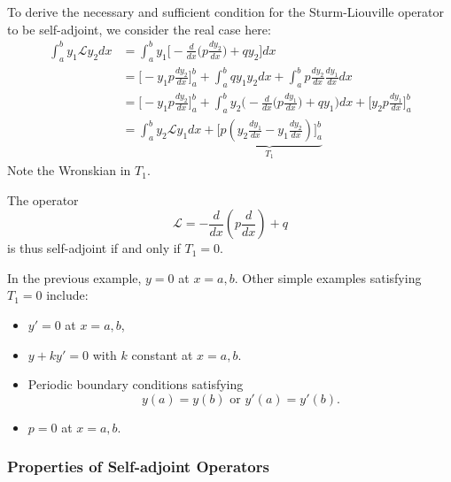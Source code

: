 \documentclass[a4paper]{article}
\renewcommand*\L{\mathcal{L}}
\begin{document}
To derive the necessary and sufficient condition for the Sturm-Liouville operator to be self-adjoint, we consider the real case here:
\begin{align*}
  \int_{a}^{b} y_1\L y_2 dx &= \int_{a}^{b} y_1 \Big[ -\frac{d}{dx} \big(p \frac{dy_2}{dx} \big) + qy_2 \Big] dx \\
                         &= \Big[-y_1 p\frac{dy_2}{dx} \Big]^b_a + \int_{a}^{b} qy_1y_2  dx + \int_{a}^{b} p\frac{dy_2}{dx} \frac{dy_1}{dx} dx \\
                         &= \Big[-y_1p \frac{dy_2}{dx} \Big]^b_a + \int_{a}^{b} y_2\Big(-\frac{d}{dx} \big(p \frac{dy_1}{dx} \big)+ qy_1 \Big) dx + \Big[ y_2p \frac{dy_1}{dx} \Big]^b_a \\
                         &= \int_{a}^{b} y_2\L y_1 dx + \underbrace{\Big[ p(y_2 \frac{dy_1}{dx} - y_1 \frac{dy_2}{dx})\Big]^b_a}_{T_1} 
\end{align*}
Note the Wronskian in \(T_1\).

The operator
\[
  \L = -\frac{d}{dx}(p \frac{d}{dx}) + q
\]
is thus self-adjoint if and only if \(T_1=0\).

In the previous example, \(y=0\) at \(x=a,b\). Other simple examples satisfying \(T_1=0\) include:
\begin{itemize}
\item \(y'=0\) at \(x=a,b\),
\item \(y+ky'=0\) with \(k\) constant at \(x=a,b\).
\item Periodic boundary conditions satisfying
\[
y(a) = y(b) \text{ or } y'(a) = y'(b).
\]
\item \(p=0\) at \(x=a,b\).
\end{itemize}

\subsubsection{Properties of Self-adjoint Operators}
\end{document}
